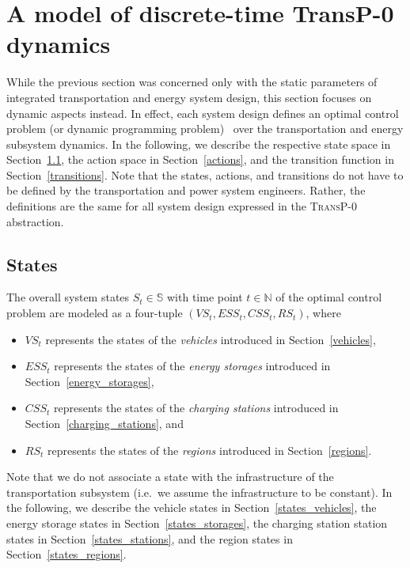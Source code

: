 \section{A model of discrete-time \textbf{TransP-0} dynamics}
\label{dynamics}

While the previous section was concerned only with the static parameters of integrated transportation and energy system design, this section focuses on dynamic aspects instead. In effect, each system design defines an optimal control problem (or dynamic programming problem)~\cite{Bertsekas1995} over the transportation and energy subsystem dynamics. In the following, we describe the respective state space in Section~\ref{states}, the action space in Section~\ref{actions}, and the transition function in Section~\ref{transitions}. Note that the states, actions, and transitions do not have to be defined by the transportation and power system engineers. Rather, the definitions are the same for all system design expressed in the \textsc{TransP-0} abstraction.

\subsection{States}
\label{states}

The overall system states $S_t \in \mathbb{S}$ with time point $t \in \mathbb{N}$ of the optimal control problem are modeled as a four-tuple $(VS_t, ESS_t, CSS_t, RS_t)$, where
\begin{itemize}
	\item $VS_t$ represents the states of the \textit{vehicles} introduced in Section~\ref{vehicles},
	\item $ESS_t$ represents the states of the \textit{energy storages} introduced in Section~\ref{energy_storages},
	\item $CSS_t$ represents the states of the \textit{charging stations} introduced in Section~\ref{charging_stations}, and
	\item $RS_t$ represents the states of the \textit{regions} introduced in Section~\ref{regions}.
\end{itemize}
Note that we do not associate a state with the infrastructure of the transportation subsystem (i.e.\ we assume the infrastructure to be constant). In the following, we describe the vehicle states in Section~\ref{states_vehicles}, the energy storage states in Section~\ref{states_storages}, the charging station station states in Section~\ref{states_stations}, and the region states in Section~\ref{states_regions}.

